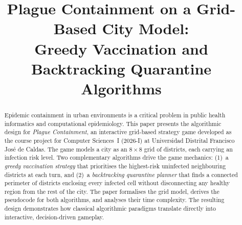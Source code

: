 \documentclass[conference]{IEEEtran}
\begin{document}
\title{Plague Containment on a Grid-Based City Model:\\
       Greedy Vaccination and Backtracking Quarantine Algorithms}

\author{
  \and
  \and
}

\maketitle

\begin{abstract}
Epidemic containment in urban environments is a critical problem in public health
informatics and computational epidemiology. This paper presents the algorithmic design
for \emph{Plague Containment}, an interactive grid-based strategy game developed as
the course project for Computer Sciences~I (2026-I) at Universidad Distrital Francisco
José de Caldas. The game models a city as an $8\times8$ grid of districts, each carrying
an infection risk level. Two complementary algorithms drive the game mechanics: (1)~a
\emph{greedy vaccination strategy} that prioritises the highest-risk uninfected
neighbouring districts at each turn, and (2)~a \emph{backtracking quarantine planner}
that finds a connected perimeter of districts enclosing every infected cell without
disconnecting any healthy region from the rest of the city. The paper formalises the
grid model, derives the pseudocode for both algorithms, and analyses their time
complexity. The resulting design demonstrates how classical algorithmic paradigms
translate directly into interactive, decision-driven gameplay.
\end{abstract}
\end{document}
